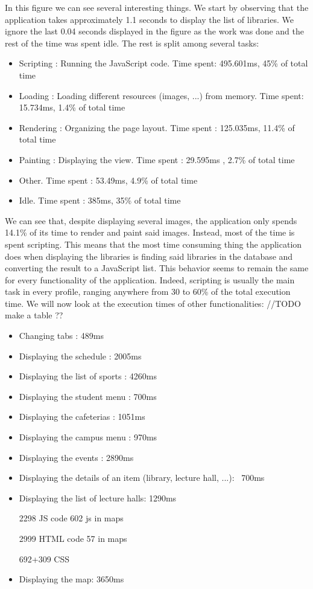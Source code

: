 \documentclass{eplmastersthesis}
\begin{document}
In this figure we can see several interesting things. We start by observing that the application takes approximately 1.1 seconds to display the list of libraries. We ignore the last 0.04 seconds displayed in the figure as the work was done and the rest of the time was spent idle. The rest is split among several tasks:
\begin{itemize}
\item Scripting : Running the JavaScript code. Time spent: 495.601ms, 45\% of total time
\item Loading : Loading different resources (images, ...) from memory. Time spent: 15.734ms, 1.4\% of total time
\item Rendering : Organizing the page layout. Time spent : 125.035ms, 11.4\% of total time
\item Painting : Displaying the view. Time spent : 29.595ms , 2.7\% of total time
\item Other. Time spent : 53.49ms, 4.9\% of total time
\item Idle. Time spent : 385ms, 35\% of total time
\end{itemize}
We can see that, despite displaying several images, the application only spends 14.1\% of its time to render and paint said images. Instead, most of the time is spent scripting. This means that the most time consuming thing the application does when displaying the libraries is finding said libraries in the database and converting the result to a JavaScript list. This behavior seems to remain the same for every functionality of the application. Indeed, scripting is usually the main task in every profile, ranging anywhere from 30 to 60\% of the total execution time. 
We will now look at the execution times of other functionalities: //TODO make a table ??
\begin{itemize}
\item Changing tabs : 489ms
\item Displaying the schedule : 2005ms
\item Displaying the list of sports : 4260ms
\item Displaying the student menu : 700ms
\item Displaying the cafeterias : 1051ms
\item Displaying the campus menu : 970ms
\item Displaying the events : 2890ms
\item Displaying the details of an item (library, lecture hall, ...): ~700ms
\item Displaying the list of lecture halls: 1290ms

2298 JS code
602 js in maps

2999 HTML code
57 in maps

692+309 CSS
\item Displaying the map: 3650ms
\end{itemize}  
\end{document}

